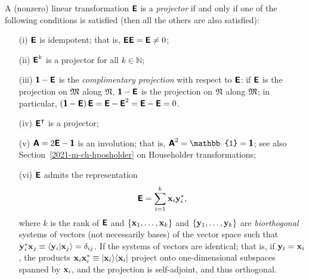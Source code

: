 A (nonzero) linear transformation $\textsf{\textbf{E}}$ is a {\em projector}
if and only if one of
the following conditions is satisfied (then all the others are also satisfied):\cite{Trenkler1994}
\begin{itemize}
\item[(i)]
$\textsf{\textbf{E}}$ is idempotent; that is,
$\textsf{\textbf{E}}\textsf{\textbf{E}}=\textsf{\textbf{E}}\neq 0$;

\item[(ii)]
$\textsf{\textbf{E}}^k$ is a projector for all $k \in \mathbb{N}$;

\item[(iii)]
$\textsf{\textbf{1}}-\textsf{\textbf{E}}$ is the {\em complimentary projection} with respect to $\textsf{\textbf{E}}$:
if $\textsf{\textbf{E}}$  is the projection
on ${\frak M}$
along ${\frak N}$,
 $\textsf{\textbf{1}}-\textsf{\textbf{E}}$ is the projection
on ${\frak N}$
along ${\frak M}$; in particular, $\left(\textsf{\textbf{1}}-\textsf{\textbf{E}}\right)\textsf{\textbf{E}}=\textsf{\textbf{E}}-\textsf{\textbf{E}}^2=\textsf{\textbf{E}}-\textsf{\textbf{E}}=0$.

\item[(iv)]
$\textsf{\textbf{E}}^\intercal$ is a projector;

\item[(v)]
$\textsf{\textbf{A}}= 2\textsf{\textbf{E}} - \textsf{\textbf{1}}$ is an involution;
that is, $\textsf{\textbf{A}}^2 = \mathbb{1}=\textsf{\textbf{1}}$;
see also Section~\ref{2021-m-ch-hposholder} on Householder transformations;

\item[(vi)]
$\textsf{\textbf{E}}$ admits the representation
\begin{equation}
\textsf{\textbf{E}} =\sum_{i=1}^k {\bf x}_i {\bf y}_i^\ast,
\label{2018-mm-ch-fdlvs-dop}
\end{equation}
where $k$ is the rank of $\textsf{\textbf{E}}$ and
$\{ {\bf x}_1, \ldots ,{\bf x}_k\}$
and
$\{ {\bf y}_1, \ldots ,{\bf y}_k\}$
are {\em biorthogonal} systems of vectors (not necessarily bases) of the vector space
such that ${\bf y}_i^\ast  {\bf x}_j \equiv \langle {\bf y}_i \vert {\bf x}_j \rangle = \delta_{ij}$.
If the systems of vectors are identical; that is, if ${\bf y}_i={\bf x}_i$,
the products $ {\bf x}_i {\bf x}_i^\ast   \equiv \vert {\bf x}_i\rangle \langle {\bf x}_i \vert$ project onto one-dimensional subspaces
spanned by ${\bf x}_i$, and the projection is self-adjoint, and thus orthogonal.



\end{itemize}

